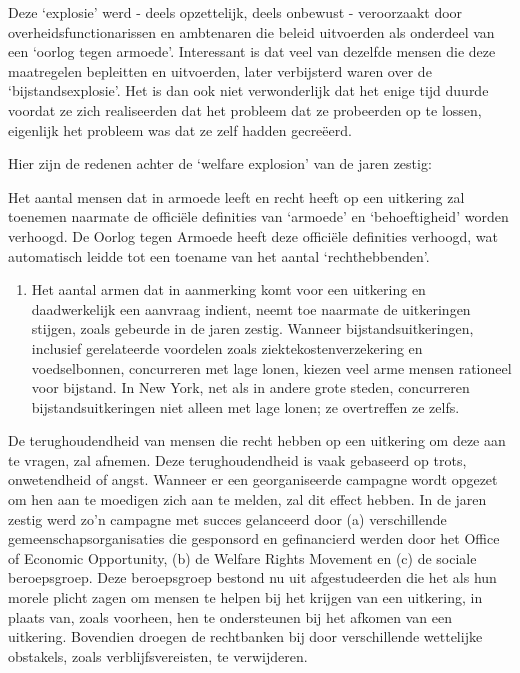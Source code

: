 \documentclass[
  a5paper,
  smalldemyvopaper,10pt,twoside,onecolumn,openright,extrafontsizes,hidelinks]{memoir}
\providecommand{\tightlist}{%
  \setlength{\itemsep}{0pt}\setlength{\parskip}{0pt}}\usepackage{longtable,booktabs,array}
\renewenvironment{quote}%
               {\list{}{\rightmargin=.6cm\leftmargin=.6cm}%
                \itshape \item[]}%
               {\endlist}
\begin{document}
\begin{quote}
Deze `explosie' werd - deels opzettelijk, deels onbewust - veroorzaakt
door overheidsfunctionarissen en ambtenaren die beleid uitvoerden als
onderdeel van een `oorlog tegen armoede'. Interessant is dat veel van
dezelfde mensen die deze maatregelen bepleitten en uitvoerden, later
verbijsterd waren over de `bijstandsexplosie'. Het is dan ook niet
verwonderlijk dat het enige tijd duurde voordat ze zich realiseerden dat
het probleem dat ze probeerden op te lossen, eigenlijk het probleem was
dat ze zelf hadden gecreëerd.
\end{quote}

Hier zijn de redenen achter de `welfare explosion' van de jaren zestig:

\begin{quote}
Het aantal mensen dat in armoede leeft en recht heeft op een uitkering
zal toenemen naarmate de officiële definities van `armoede' en
`behoeftigheid' worden verhoogd. De Oorlog tegen Armoede heeft deze
officiële definities verhoogd, wat automatisch leidde tot een toename
van het aantal `rechthebbenden'.

\begin{enumerate}
\def\labelenumi{\arabic{enumi}.}
\setcounter{enumi}{1}
\tightlist
\item
  Het aantal armen dat in aanmerking komt voor een uitkering en
  daadwerkelijk een aanvraag indient, neemt toe naarmate de uitkeringen
  stijgen, zoals gebeurde in de jaren zestig. Wanneer
  bijstandsuitkeringen, inclusief gerelateerde voordelen zoals
  ziektekostenverzekering en voedselbonnen, concurreren met lage lonen,
  kiezen veel arme mensen rationeel voor bijstand. In New York, net als
  in andere grote steden, concurreren bijstandsuitkeringen niet alleen
  met lage lonen; ze overtreffen ze zelfs.
\end{enumerate}

De terughoudendheid van mensen die recht hebben op een uitkering om deze
aan te vragen, zal afnemen. Deze terughoudendheid is vaak gebaseerd op
trots, onwetendheid of angst. Wanneer er een georganiseerde campagne
wordt opgezet om hen aan te moedigen zich aan te melden, zal dit effect
hebben. In de jaren zestig werd zo'n campagne met succes gelanceerd door
(a) verschillende gemeenschapsorganisaties die gesponsord en
gefinancierd werden door het Office of Economic Opportunity, (b) de
Welfare Rights Movement en (c) de sociale beroepsgroep. Deze
beroepsgroep bestond nu uit afgestudeerden die het als hun morele plicht
zagen om mensen te helpen bij het krijgen van een uitkering, in plaats
van, zoals voorheen, hen te ondersteunen bij het afkomen van een
uitkering. Bovendien droegen de rechtbanken bij door verschillende
wettelijke obstakels, zoals verblijfsvereisten, te verwijderen.


\end{quote}
\end{document}
